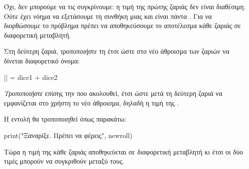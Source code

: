 \documentclass[a4paper,11pt,oneside]{book}
\begin{document}
\begin{step}
\begin{answer}[]
Όχι,%
δεν μπορούμε να τις συγκρίνουμε: η τιμή της πρώτης ζαριάς δεν είναι διαθέσιμη. Ούτε έχει νόημα να εξετάσουμε τη συνθήκη  μιας και είναι πάντα . Για να διορθώσουμε το πρόβλημα πρέπει να αποθηκεύσουμε το αποτέλεσμα κάθε ζαριάς σε διαφορετική μεταβλητή.
\end{answer}

Στη δεύτερη ζαριά, \emph{τροποποιήστε} τη  έτσι ώστε στο νέο άθροισμα των ζαριών να δίνεται διαφορετικό όνομα:

\begin{pyplain}
|| = dice1 + dice2
\end{pyplain}

\emph{Τροποποιήστε} επίσης την  που ακολουθεί, έτσι ώστε μετά τη δεύτερη ζαριά να εμφανίζεται στο χρήστη το νέο άθροισμα, δηλαδή η τιμή της .

\begin{answer}
Η εντολή  θα τροποποιηθεί όπως παρακάτω:

\begin{pynew}
print("Ξαναρίξε. Πρέπει να φέρεις", newroll)
\end{pynew}
\end{answer}

Τώρα η τιμή της κάθε ζαριάς αποθηκεύεται σε διαφορετική μεταβλητή κι έτσι οι δύο τιμές μπορούν να συγκριθούν μεταξύ τους.
\end{step}
\end{document}
